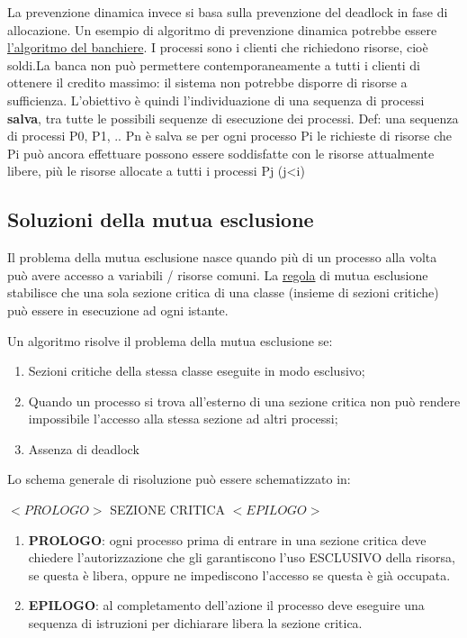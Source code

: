 \documentclass{article}
\begin{document}
\noindent La prevenzione dinamica invece si basa sulla prevenzione del deadlock in fase di allocazione. Un esempio di algoritmo di prevenzione 
dinamica potrebbe essere \underline{l'algoritmo del banchiere}.
\noindent I processi sono i clienti che richiedono risorse, cioè soldi.La banca non può permettere contemporaneamente a tutti i clienti di ottenere 
il credito massimo: il sistema non potrebbe disporre di risorse a sufficienza. L'obiettivo è quindi l'individuazione di una sequenza di
 processi \textbf{salva}, tra tutte le possibili sequenze di esecuzione dei processi.
Def: una sequenza di processi {P0, P1, .. Pn} è salva se per ogni processo Pi le richieste di risorse che Pi può ancora effettuare possono essere soddisfatte
 con le risorse attualmente libere, più le risorse allocate a tutti i processi Pj (j<i)

\subsection{Soluzioni della mutua esclusione}
\noindent Il problema della mutua esclusione nasce quando più di un processo alla volta può avere accesso a variabili / risorse comuni. 
La \underline{regola} di mutua esclusione stabilisce che una sola sezione critica di una classe (insieme di sezioni critiche) può essere 
in esecuzione ad ogni istante.

Un algoritmo risolve il problema della mutua esclusione se:
\begin{enumerate}
    \item Sezioni critiche della stessa classe eseguite in modo esclusivo;
    \item Quando un processo si trova all'esterno di una sezione critica non può rendere impossibile
     l'accesso alla stessa sezione ad altri processi;
    \item Assenza di deadlock
\end{enumerate}

\noindent Lo schema generale di risoluzione può essere schematizzato in:

\noindent $<PROLOGO>$ SEZIONE CRITICA $<EPILOGO>$
\begin{enumerate}
    \item \textbf{PROLOGO}: ogni processo prima di entrare in una sezione critica deve chiedere l'autorizzazione che gli garantiscono
    l'uso ESCLUSIVO della risorsa, se questa è libera, oppure ne impediscono l'accesso se questa è già occupata.
    \item \textbf{EPILOGO}: al completamento dell'azione il processo deve eseguire una sequenza di istruzioni per dichiarare 
    libera la sezione critica.
\end{enumerate}
\end{document}
